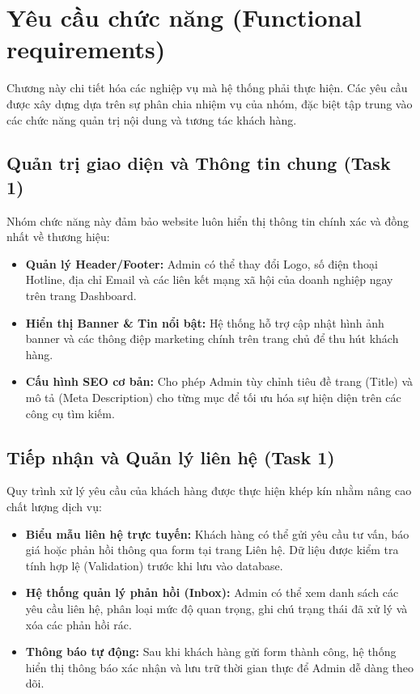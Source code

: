 \section{Yêu cầu chức năng (Functional requirements)}

Chương này chi tiết hóa các nghiệp vụ mà hệ thống phải thực hiện. Các yêu cầu được xây dựng dựa trên sự phân chia nhiệm vụ của nhóm, đặc biệt tập trung vào các chức năng quản trị nội dung và tương tác khách hàng.

\subsection{Quản trị giao diện và Thông tin chung (Task 1)}
Nhóm chức năng này đảm bảo website luôn hiển thị thông tin chính xác và đồng nhất về thương hiệu:
\begin{itemize}
    \item \textbf{Quản lý Header/Footer:} Admin có thể thay đổi Logo, số điện thoại Hotline, địa chỉ Email và các liên kết mạng xã hội của doanh nghiệp ngay trên trang Dashboard.
    \item \textbf{Hiển thị Banner \& Tin nổi bật:} Hệ thống hỗ trợ cập nhật hình ảnh banner và các thông điệp marketing chính trên trang chủ để thu hút khách hàng.
    \item \textbf{Cấu hình SEO cơ bản:} Cho phép Admin tùy chỉnh tiêu đề trang (Title) và mô tả (Meta Description) cho từng mục để tối ưu hóa sự hiện diện trên các công cụ tìm kiếm.
\end{itemize}

\subsection{Tiếp nhận và Quản lý liên hệ (Task 1)}
Quy trình xử lý yêu cầu của khách hàng được thực hiện khép kín nhằm nâng cao chất lượng dịch vụ:
\begin{itemize}
    \item \textbf{Biểu mẫu liên hệ trực tuyến:} Khách hàng có thể gửi yêu cầu tư vấn, báo giá hoặc phản hồi thông qua form tại trang Liên hệ. Dữ liệu được kiểm tra tính hợp lệ (Validation) trước khi lưu vào database.
    \item \textbf{Hệ thống quản lý phản hồi (Inbox):} Admin có thể xem danh sách các yêu cầu liên hệ, phân loại mức độ quan trọng, ghi chú trạng thái đã xử lý và xóa các phản hồi rác.
    \item \textbf{Thông báo tự động:} Sau khi khách hàng gửi form thành công, hệ thống hiển thị thông báo xác nhận và lưu trữ thời gian thực để Admin dễ dàng theo dõi.
\end{itemize}

